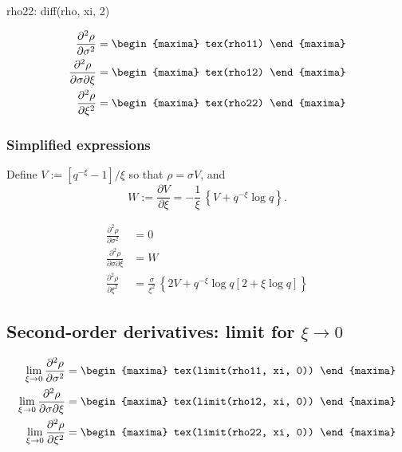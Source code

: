\begin{maxima}
  rho22:  diff(rho, xi, 2)
\end{maxima}

{\color{MonVertF}
\begin{align*}
\frac{\partial^2 \rho}{\partial \sigma^2} &= 
\begin{maxima}
  tex(rho11)
\end{maxima} \\ 
\frac{\partial^2 \rho}{\partial \sigma \partial \xi} &= 
\begin{maxima}
  tex(rho12)
\end{maxima} \\ 
\frac{\partial^2 \rho}{\partial \xi^2} &= 
\begin{maxima}
  tex(rho22)
\end{maxima} 
\end{align*}
}


\subsubsection*{Simplified expressions}

Define $V:= [q^{-\xi} - 1] / \xi$ so that $\rho = \sigma V$, and
$$
W := \frac{\partial V}{\partial \xi}
=  - \frac{1}{\xi}\, \left\{ V + q^{-\xi} \log q \right\}.
$$



{\color{red}
\begin{align*}
  \frac{\partial^2 \rho}{\partial \sigma^2}
  &=  0 \\ 
  \frac{\partial^2 \rho}{\partial \sigma \partial \xi}
  &= W\\ 
  \frac{\partial^2 \rho}{\partial \xi^2}
  &= \frac{\sigma}{\xi^2}\, \left\{ 2 V + q^{-\xi} \log q \left[2 + \xi \log q \right] \right\}         
\end{align*}
}

\subsection{Second-order derivatives: limit for $\xi \to 0$}

{\color{MonVertF}
\begin{align*}
  \lim_{\xi \to 0} \frac{\partial^2 \rho}{\partial \sigma^2}
  &= 
\begin{maxima}
 tex(limit(rho11, xi, 0))
\end{maxima} \\
  \lim_{\xi \to 0} \frac{\partial^2 \rho}{\partial \sigma \partial\xi}
  &= 
\begin{maxima}
 tex(limit(rho12, xi, 0))
\end{maxima} \\
  \lim_{\xi \to 0} \frac{\partial^2 \rho}{\partial \xi^2}
  &= 
\begin{maxima}
 tex(limit(rho22, xi, 0))
\end{maxima}
\end{align*}
}

